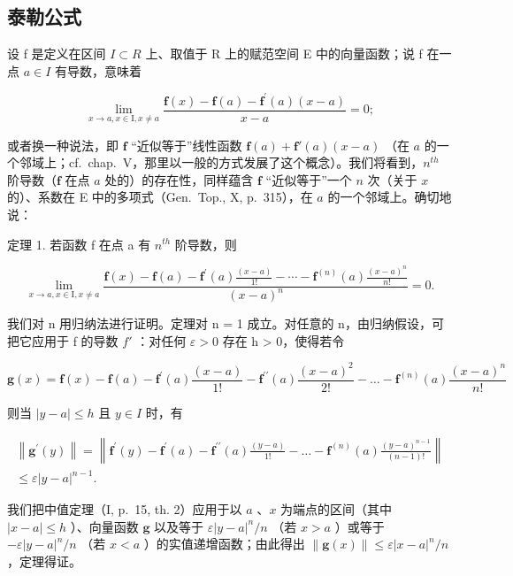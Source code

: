 \subsection{泰勒公式}

设 f 是定义在区间 \(I \subset R\) 上、取值于 R 上的赋范空间 E 中的向量函数；说 f 在一点 \(a \in I\) 有导数，意味着

\[
\lim _ {x \to a, x \in \mathrm{I}, x \neq a} \frac {\mathbf {f} (x) - \mathbf {f} (a) - \mathbf {f} ^ {\prime} (a) (x - a)}{x - a} = 0;\tag{6}
\]

或者换一种说法，即 \(\mathbf{f}\) “近似等于”线性函数 \(\mathbf{f}(a) + \mathbf{f}'(a)(x - a)\) （在 \(a\) 的一个邻域上；cf.~chap.~V，那里以一般的方式发展了这个概念）。我们将看到，\(n^{th}\) 阶导数（\(\mathbf{f}\) 在点 \(a\) 处的）的存在性，同样蕴含 \(\mathbf{f}\) “近似等于”一个 \(n\) 次（关于 \(x\) 的）、系数在 E 中的多项式（Gen.~Top., X, p.~315），在 \(a\) 的一个邻域上。确切地说：

定理 1. 若函数 f 在点 a 有 \(n^{th}\) 阶导数，则

\[
\lim _ {x \to a, x \in \mathrm{I}, x \neq a} \frac {\mathbf {f} (x) - \mathbf {f} (a) - \mathbf {f} ^ {\prime} (a) \frac {(x - a)}{1 !} - \cdots - \mathbf {f} ^ {(n)} (a) \frac {(x - a) ^ {n}}{n !}}{(x - a) ^ {n}} = 0.\tag{7}
\]

我们对 n 用归纳法进行证明。定理对 n = 1 成立。对任意的 n，由归纳假设，可把它应用于 f 的导数 \(f'\) ：对任何 \(\varepsilon > 0\) 存在 h \textgreater{} 0，使得若令

\[
\mathbf {g} (x) = \mathbf {f} (x) - \mathbf {f} (a) - \mathbf {f} ^ {\prime} (a) \frac {(x - a)}{1 !} - \mathbf {f} ^ {\prime \prime} (a) \frac {(x - a) ^ {2}}{2 !} - \dots - \mathbf {f} ^ {(n)} (a) \frac {(x - a) ^ {n}}{n !}
\]

则当 \(|y - a| \leqslant h\) 且 \(y \in I\) 时，有

\[
\begin{array}{l} \left\| \mathbf {g} ^ {\prime} (y) \right\| = \left\| \mathbf {f} ^ {\prime} (y) - \mathbf {f} ^ {\prime} (a) - \mathbf {f} ^ {\prime \prime} (a) \frac {(y - a)}{1 !} - \dots - \mathbf {f} ^ {(n)} (a) \frac {(y - a) ^ {n - 1}}{(n - 1) !} \right\| \\ \leqslant \varepsilon | y - a | ^ {n - 1}. \end{array}
\]

我们把中值定理（I, p.~15, th. 2）应用于以 \(a\) 、\(x\) 为端点的区间（其中 \(|x - a| \leqslant h\) ）、向量函数 \(\mathbf{g}\) 以及等于 \(\varepsilon |y - a|^n / n\) （若 \(x > a\) ）或等于 \(-\varepsilon |y - a|^n / n\) （若 \(x < a\) ）的实值递增函数；由此得出 \(\| \mathbf{g}(x) \| \leqslant \varepsilon |x - a|^n / n\) ，定理得证。

